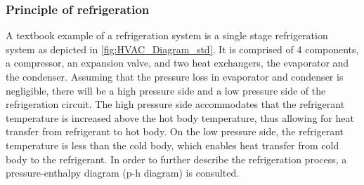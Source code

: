 \subsubsection{Principle of refrigeration}
A textbook example of a refrigeration system is a single stage refrigeration system as depicted in \cref{fig:HVAC_Diagram_std}. It is comprised of 4 components, a compressor, an expansion valve, and two heat exchangers, the evaporator and the condenser. Assuming that the pressure loss in evaporator and condenser is negligible, there will be a high pressure side and a low pressure side of the refrigeration circuit. The high pressure side accommodates that the refrigerant temperature is increased above the hot body temperature, thus allowing for heat transfer from refrigerant to hot body. On the low pressure side, the refrigerant temperature is less than the cold body, which enables heat transfer from cold body to the refrigerant. In order to further describe the refrigeration process, a pressure-enthalpy diagram (p-h diagram) is consulted.
